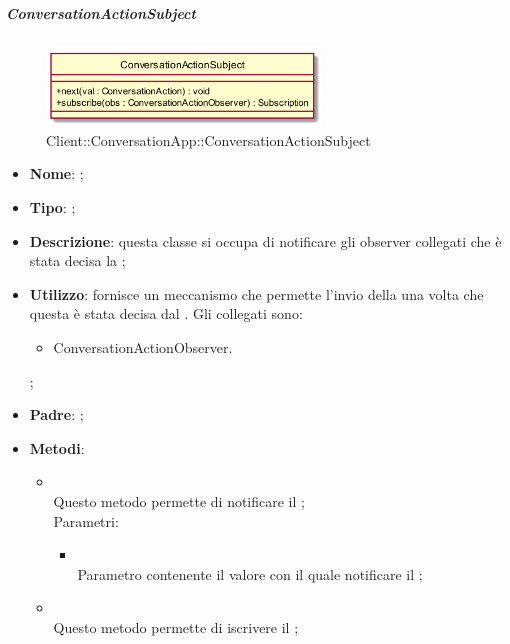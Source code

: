 \hypertarget{ConversationActionSubject_label}{\subparagraph{ConversationActionSubject}}
\begin{figure}[h]
	\centering
	\includegraphics[width=0.65\textwidth,height=\textheight,keepaspectratio]{images/ClassConversationActionSubject.png}
	\caption{Client::ConversationApp::ConversationActionSubject}
\end{figure}
\begin{itemize}
	\item \textbf{Nome}: ;
	\item \textbf{Tipo}: ;
	\item \textbf{Descrizione}: questa classe si occupa di notificare gli observer collegati che è stata decisa la ;
	\item \textbf{Utilizzo}: fornisce un meccanismo che permette l'invio della  una volta che questa è stata decisa dal .
Gli  collegati sono:
\begin{itemize}
\item ConversationActionObserver.
\end{itemize};
	\item \textbf{Padre}: ;
	\item \textbf{Metodi}:
	\begin{itemize}
		\item[]  \\		Questo metodo permette di notificare il ;\\
		Parametri:
		\begin{itemize}
			\item {} \\
			Parametro contenente il valore con il quale notificare il ;
		\end{itemize}
		\item[]  \\		Questo metodo permette di iscrivere il ;\\

\end{itemize}
\end{itemize}
